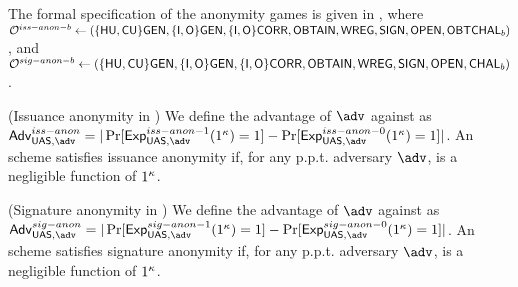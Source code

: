 The formal specification of the anonymity games is given in
, where
$\mathcal{O}^{iss-anon-b} \gets (\lbrace\mathsf{HU},\mathsf{CU}\rbrace\mathsf{GEN},\lbrace\mathsf{I},\mathsf{O}\rbrace\mathsf{GEN},\lbrace\mathsf{I},
\mathsf{O}\rbrace\mathsf{CORR},\mathsf{OBTAIN},\mathsf{WREG},\mathsf{SIGN},\mathsf{OPEN},\mathsf{OBTCHAL}_b)$, and $\mathcal{O}^{sig-anon-b}
\gets (\lbrace\mathsf{HU},\mathsf{CU}\rbrace\mathsf{GEN},\lbrace\mathsf{I},\mathsf{O}\rbrace\mathsf{GEN},\lbrace\mathsf{I},\mathsf{O}\rbrace
\mathsf{CORR},\mathsf{OBTAIN},\mathsf{WREG},\mathsf{SIGN},\mathsf{OPEN},\mathsf{CHAL}_b)$.

\begin{figure*}[htp!]
  \centering
  \caption{Issuance and signature anonymity experiments for \UAS schemes.}
  \label{fig:exp-uas-anonb}
\end{figure*}

\begin{definition}{(Issuance anonymity in \UAS)}
  \label{def:issue-anonymity-uas}  
  We define the advantage \AdvIssAnon of $\adv$ against \ExpIssAnonb as
  $\AdvIssAnon=|\Pr\lbrack\ExpIssAnono(1^\secpar)=1\rbrack-
  \Pr\lbrack\ExpIssAnonz(1^\secpar)=1\rbrack|$.
  An \UAS scheme satisfies issuance anonymity if, for any p.p.t. adversary
  $\adv$, \AdvIssAnon is a negligible function of $1^\kappa$.
\end{definition}

\begin{definition}{(Signature anonymity in \UAS)}
  \label{def:sign-anonymity-uas}  
  We define the advantage \AdvSigAnon of $\adv$ against \ExpSigAnonb as
  $\AdvSigAnon=|\Pr\lbrack\ExpSigAnono(1^\secpar)=1\rbrack-
  \Pr\lbrack\ExpSigAnonz(1^\secpar)=1\rbrack|$.
  An \UAS scheme satisfies signature anonymity if, for any p.p.t. adversary
  $\adv$, \AdvSigAnon is a negligible function of $1^\kappa$.
\end{definition}

